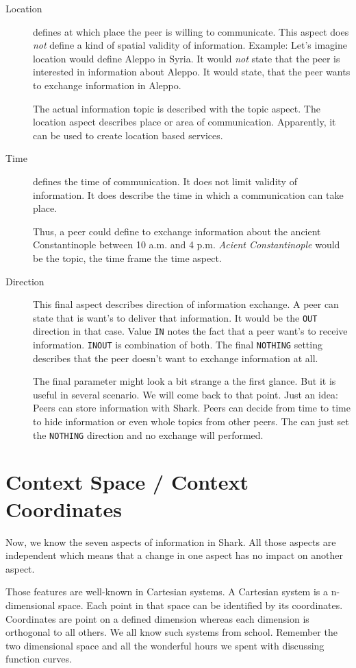 \begin{description}
    \item[Location] 
defines at which place the peer is willing to communicate. This aspect does {\it not} define a kind of spatial validity of information. Example: Let's imagine location would define Aleppo in Syria. It would {\it not} state that the peer is interested in information about Aleppo. It would state, that the peer wants to exchange information in Aleppo.

The actual information topic is described with the topic aspect. The location aspect describes place or area of communication. Apparently, it can be used to create location based services.

    \item[Time] 
defines the time of communication. It does not limit validity of information. It does describe the time in which a communication can take place.

Thus, a peer could define to exchange information about the ancient Constantinople between 10 a.m. and 4 p.m. {\it Acient Constantinople} would be the topic, the time frame the time aspect.

    \item[Direction] 
This final aspect describes direction of information exchange. A peer can state that is want's to deliver that information. It would be the {\tt OUT} direction in that case. Value {\tt IN} notes the fact that a peer want's to receive information. {\tt INOUT} is combination of both. The final {\tt NOTHING} setting describes that the peer doesn't want to exchange information at all.

The final parameter might look a bit strange a the first glance. But it is useful in several scenario. We will come back to that point. Just an idea: Peers can store information with Shark. Peers can decide from time to time to hide information or even whole topics from other peers. The can just set the {\tt NOTHING} direction and no exchange will performed.

\end{description}

\section{Context Space / Context Coordinates}

Now, we know the seven aspects of information in Shark. All those aspects are independent which means that a change in one aspect has no impact on another aspect. 

Those features are well-known in Cartesian systems. A Cartesian system is a n-dimensional space. Each point in that space can be identified by its coordinates. Coordinates are point on a defined dimension whereas each dimension is orthogonal to all others. We all know such systems from school. Remember the two dimensional space and all the wonderful hours we spent with discussing
function curves.

